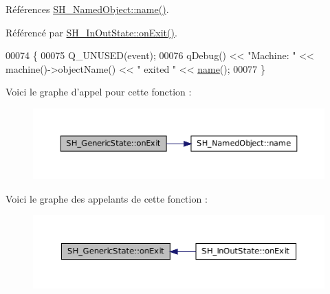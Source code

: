 Références \hyperlink{classSH__NamedObject_a970f265df31b28b2179bbbceb6170ac2}{S\-H\-\_\-\-Named\-Object\-::name()}.



Référencé par \hyperlink{classSH__InOutState_a36636cba0d68476288bce5fd4c041db0}{S\-H\-\_\-\-In\-Out\-State\-::on\-Exit()}.


\begin{DoxyCode}
00074 \{
00075     Q\_UNUSED(event);
00076     qDebug() << \textcolor{stringliteral}{"Machine: "} << machine()->objectName() << \textcolor{stringliteral}{" exited  "} << \hyperlink{classSH__NamedObject_a970f265df31b28b2179bbbceb6170ac2}{name}();
00077 \}
\end{DoxyCode}


Voici le graphe d'appel pour cette fonction \-:
\nopagebreak
\begin{figure}[H]
\begin{center}
\leavevmode
\includegraphics[width=350pt]{classSH__GenericState_accf3326011661417fb0ca0eede3ed9a1_cgraph}
\end{center}
\end{figure}




Voici le graphe des appelants de cette fonction \-:
\nopagebreak
\begin{figure}[H]
\begin{center}
\leavevmode
\includegraphics[width=350pt]{classSH__GenericState_accf3326011661417fb0ca0eede3ed9a1_icgraph}
\end{center}
\end{figure}


